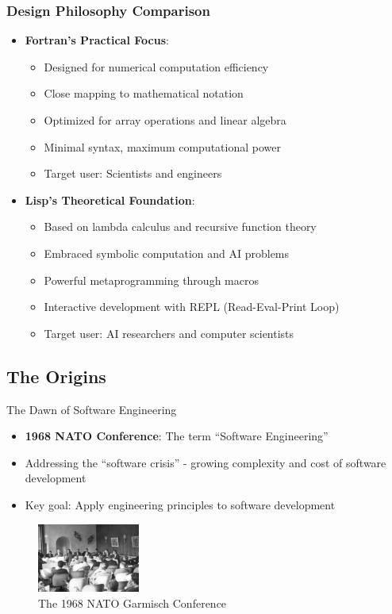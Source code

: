 \documentclass{beamer}
\begin{document}
\begin{frame}[t]
\frametitle{Design Philosophy Comparison}
\begin{itemize}
    \item \textbf{Fortran's Practical Focus}:
    \begin{itemize}
        \item Designed for numerical computation efficiency
        \item Close mapping to mathematical notation
        \item Optimized for array operations and linear algebra
        \item Minimal syntax, maximum computational power
        \item Target user: Scientists and engineers
    \end{itemize}
    
    \item \textbf{Lisp's Theoretical Foundation}:
    \begin{itemize}
        \item Based on lambda calculus and recursive function theory
        \item Embraced symbolic computation and AI problems
        \item Powerful metaprogramming through macros
        \item Interactive development with REPL (Read-Eval-Print Loop)
        \item Target user: AI researchers and computer scientists
    \end{itemize}
\end{itemize}
\end{frame}


\subsection{The Origins}

\begin{frame}[t]{The Dawn of Software Engineering}
\begin{itemize}
    \item \textbf{1968 NATO Conference}: The term ``Software Engineering'' 
    \item Addressing the ``software crisis'' - growing complexity and cost of software development
    \item Key goal: Apply engineering principles to software development
\end{itemize}
    \begin{figure}[b]
        \centering
        \includegraphics[width=0.3\textwidth]{images/NATO-conference-photo.png}
        \caption{The 1968 NATO Garmisch Conference}
    \end{figure}
\end{frame}
\end{document}
